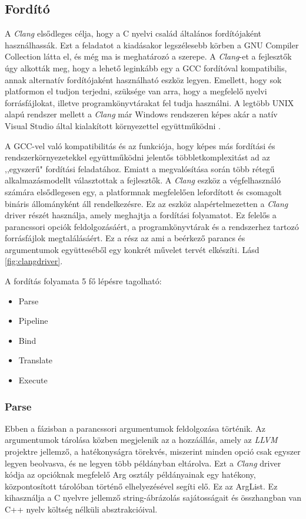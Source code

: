 \documentclass[a4paper,12pt]{report}
\begin{document}
\subsection{Fordító}
A \emph{Clang} elsődleges célja, hogy a C nyelvi család általános fordítójaként használhassák. Ezt a feladatot a kiadásakor legszélesebb körben a GNU Compiler Collection látta el, és még ma is meghatározó a szerepe. A \emph{Clang}-et a fejlesztők úgy alkották meg, hogy a lehető leginkább egy a GCC fordítóval kompatibilis, annak alternatív fordítójaként használható eszköz legyen. Emellett, hogy sok platformon el tudjon terjedni, szüksége van arra, hogy a megfelelő nyelvi forrásfájlokat, illetve programkönyvtárakat fel tudja használni. A legtöbb UNIX alapú rendszer mellett a \emph{Clang} már Windows rendszeren képes akár a natív Visual Studio által kialakított környezettel együttműködni \cite{clangusermanual}.

A GCC-vel való kompatibilitás és az funkciója, hogy képes más fordítási és rendszerkörnyezetekkel együttműködni jelentős többletkomplexitást ad az ,,egyszerű" fordítási feladatához. Emiatt a megvalósítása során több rétegű alkalmazásmodellt választottak a fejlesztők. A \emph{Clang} eszköz a végfelhasználó számára elsődlegesen egy, a platformnak megfelelően lefordított és csomagolt bináris állományként áll rendelkezésre. Ez az eszköz alapértelmezetten a \emph{Clang} driver részét használja, amely meghajtja a fordítási folyamatot. Ez felelős a parancssori opciók feldolgozásáért, a programkönyvtárak és a rendszerhez tartozó forrásfájlok megtalálásáért. Ez a rész az ami a beérkező parancs és argumentumok együtteséből egy konkrét művelet tervét elkészíti. Lásd \ref{fig:clangdriver}.

A fordítás folyamata 5 fő lépésre tagolható:
\begin{itemize}
\item Parse
\item Pipeline
\item Bind
\item Translate
\item Execute
\end{itemize}

\subsubsection{Parse}
Ebben a fázisban a parancssori argumentumok feldolgozása történik. Az argumentumok tárolása közben megjelenik az a hozzáállás, amely az \emph{LLVM} projektre jellemző, a hatékonyságra törekvés, miszerint minden opció csak egyszer legyen beolvasva, és ne legyen több példányban eltárolva. Ezt a \emph{Clang} driver kódja az opcióknak megfelelő Arg osztály példányainak egy hatékony, központosított tárolóban történő elhelyezésével segíti elő. Ez az ArgList. Ez kihasználja a C nyelvre jellemző string-ábrázolás sajátosságait és  összhangban van C++ nyelv költség nélküli absztrakcióival.
\end{document}

